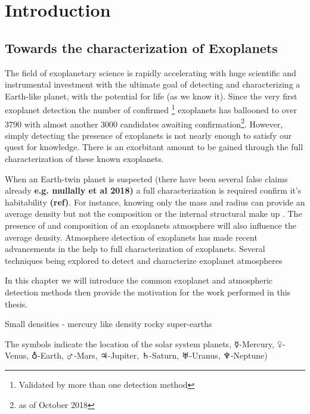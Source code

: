 \chapter{Introduction}  %
\label{cha:introduction}

\section{Towards the characterization of Exoplanets}

The field of exoplanetary science is rapidly accelerating with huge scientific and instrumental investment with the ultimate goal of detecting and characterizing a Earth-like planet, with the potential for life (as we know it). Since the very first exoplanet detection \citet{ mayor_jupitermass_1995} the number of confirmed \footnote{Validated by more than one detection method} exoplanets has ballooned to over 3790 with almost another 3000 candidates awaiting confirmation\footnote{as of October 2018}. However, simply detecting the presence of exoplanets is not nearly enough to satisfy our quest for knowledge. There is an exorbitant amount to be gained through the full characterization of these known exoplanets.

When an Earth-twin planet is suspected (there have been several false claims already \textbf{e.g. mullally et al 2018)} a full characterization is required confirm it's habitability \textbf{(ref)}. For instance, knowing only the mass and radius can provide an average density but not the composition or the internal structural make up \citet{a paper about composition degeneracy}. The presence of and composition of an exoplanets atmosphere will also influence the average density. Atmosphere detection of exoplanets has made recent advancements in the help to full characterization of exoplanets. Several techniques being explored to detect and characterize exoplanet atmospheres \citep[e.g.]{martins_reflected_2015, transmission spectroscopy,  pikorz 201  ,snellen?}

In this chapter we will introduce the common exoplanet and atmospheric detection methods then provide the motivation for the work performed in this thesis.



Small densities - mercury like  density \citet{dittmann_temperate_2017, santerne_earthsized_2018, ment_second_2018} rocky super-earths


The symbols indicate the location of the solar system planets, $\mercury$-Mercury, $\venus$-Venus, $\earth$-Earth, $\mars$-Mars, $\jupiter$-Jupiter, $\saturn$-Saturn, $\uranus$-Uranus, $\neptune$-Neptune)


